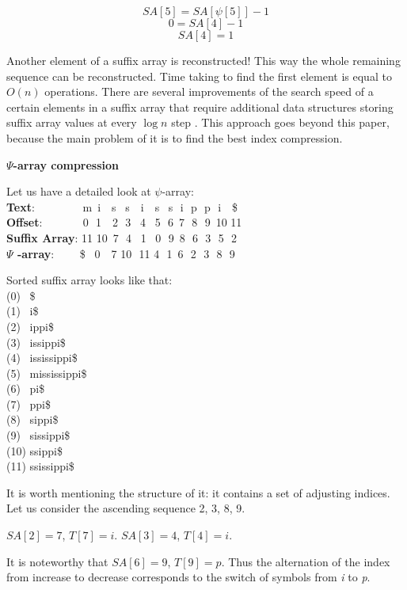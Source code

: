 \[SA[5] = SA[\psi[5]] - 1\]
\[0 = SA[4] - 1\]
\[SA[4] = 1\]

Another element of a suffix array is reconstructed!
This way the whole remaining sequence can be reconstructed.
Time taking to find the first element is equal to \(O(n)\) operations.
There are several improvements of the search speed of a certain elements in a suffix array
that require additional data structures storing suffix array values at every \(\log n\) step \cite{andersensimple}.
This approach goes beyond this paper, because the main problem of it is to find the best index compression.

\textbf{$\Psi$-array compression}

Let us have a detailed look at $\psi$-array:
\\ \textbf{Text}:\,\,\,\,\,\,\,\,\,\,\,\,\,\,\,\,\,\,\,\,\,\,\,\, m \,i \,\,\,\,s \,\,\,s \,\,\,\,i \,\,\,\,s \,\,\,s \,\,i \,\,p \,\,p \,\,i \,\,\,\,\$
\\ \textbf{Offset}:\,\,\,\,\,\,\,\,\,\,\,\,\,\,\,\,\,\,\,\, 0 \,\,1 \,\,\,\,2 \,\,3 \,\,\,4 \,\,\,5 \,\,6 \,7 \,\,8 \,\,9 \,10 11
\\ \textbf{Suffix Array}:   11 10 \,7 \,\,4 \,\,\,1 \,\,\,0 \,\,9 \,8 \,\,6 \,\,3 \,\,5 \,\,2
\\ \textbf{$\Psi$ -array}: \,\,\,\,\,\,\,\,\,\,\,\,\$ \,\,\,0 \,\,\,\,7 10 \,\,11 4 \,\,1 \,6 \,\,2 \,\,3 \,\,8 \,\,9

Sorted suffix array looks like that:
\\ (0) \,\,\,\$
\\ (1) \,\,\,i\$
\\ (2) \,\,\,ippi\$
\\ (3) \,\,\,issippi\$
\\ (4) \,\,\,ississippi\$
\\ (5) \,\,\,mississippi\$
\\ (6) \,\,\,pi\$
\\ (7) \,\,\,ppi\$
\\ (8) \,\,\,sippi\$
\\ (9) \,\,\,sissippi\$
\\ (10) ssippi\$
\\ (11) ssissippi\$

It is worth mentioning the structure of it: it contains a set of adjusting indices.
Let us consider the ascending sequence 2, 3, 8, 9.

$SA[2] = 7$, $T[7] = i$.
$SA[3] = 4$, $T[4] = i$.

It is noteworthy that $SA[6] = 9$, $T[9] = p$.
Thus the alternation of the index from increase to decrease corresponds to the switch of symbols from \emph{i} to \emph{p}.

